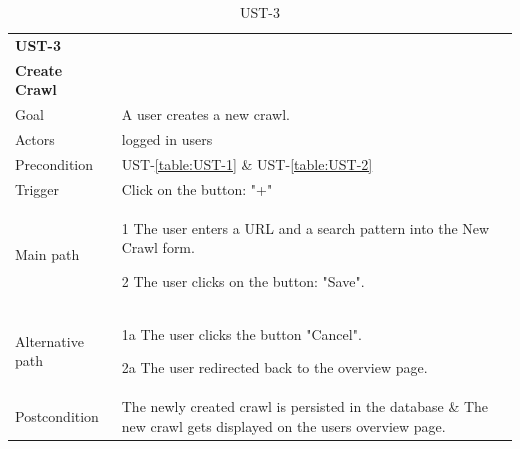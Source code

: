 \documentclass[titlepage, 12pt]{article}
\newenvironment{packed_itemize}{
  \vspace{-\topsep}
  \begin{itemize}
    \setlength{\itemsep}{1pt}
    \setlength{\parskip}{0pt}
    \setlength{\parsep}{0pt}
  }{\end{itemize}}
\begin{document}
\begin{table}[H]
    \begin{center}
  
      \begin{tabular}{p{4cm}|p{10cm}}
        \textbf{UST-3}\\ \textbf{Create Crawl}                                            \\
        \hline
        Goal             & A user creates a new crawl.                  \\
        \hline
        Actors           & logged in users                                               \\
        \hline
        Precondition     & UST-\ref{table:UST-1} \& UST-\ref{table:UST-2}                \\
        \hline
        Trigger          & Click on the button: "+"                                   \\
        \hline
        Main path        &
        \begin{packed_itemize}
          \item [1] The user enters a URL and a search pattern into the New Crawl form.
          \item [2] The user clicks on the button: "Save".
        \end{packed_itemize}                                                         \\
        \hline
        Alternative path &
        \begin{packed_itemize}
          \item [1a] The user clicks the button "Cancel".
          \item [2a] The user redirected back to the overview page.
        \end{packed_itemize}                                                         \\
        \hline
        Postcondition    & The newly created crawl is persisted in the database \& The new crawl gets displayed on the users overview page. \\
      \end{tabular}
  
      \caption{UST-3}
      \label{table:UST-3}
  
    \end{center}
  \end{table}
\end{document}
